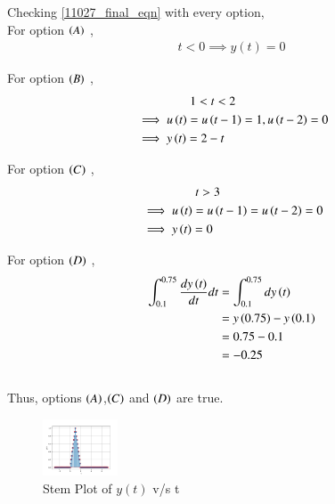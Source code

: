 \documentclass[journal,12pt,twocolumn]{IEEEtran}
\theoremstyle{remark}
\begin{document}
Checking \eqref{11027_final_eqn} with every option,\\
For option $\left(A\right)$ ,
\begin{align}
	t<0 \implies y(t) = 0
\end{align}

For option $\left(B\right)$ , 
\begin{align}
	&\;\;\;\;\;\;\;\;\;\;\;\;\;\;\;\;1<t<2\\ 
	&\implies u\left(t\right)=u\left(t-1\right) = 1, u\left(t-2\right)=0\\
	&\implies y\left(t\right) = 2-t
\end{align}

For option $\left(C\right)$ ,
\begin{align}
	&\;\;\;\;\;\;\;\;\;\;\;\;\;\;\;\;t>3
	\\ &\implies u\left(t\right)=u\left(t-1\right) = u\left(t-2\right) = 0\\
	&\implies y\left(t\right) = 0
\end{align}

For option $\left(D\right)$ ,
\begin{align}
    \int_{0.1} ^ {0.75} \frac{dy\left(t\right)}{dt} dt &= 
    \int_{0.1} ^ {0.75} dy\left(t\right) \\&= y\left(0.75\right) - y\left(0.1\right) \\
    &= 0.75 - 0.1\\
    &= -0.25
\end{align}
\\
Thus, options $\left(A\right)$,$\left(C\right)$ and $\left(D\right)$ are true.\\
\begin{figure}[h]
    \includegraphics[width=0.199\textwidth]{figs/y(t)_vs_t.png}
    \caption{Stem Plot of $y(t)$ v/s t}
\end{figure}
\end{document}
